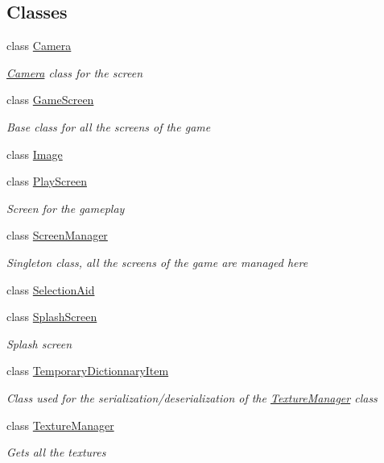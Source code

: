 \subsection*{Classes}
\begin{DoxyCompactItemize}
\item 
class \hyperlink{class_hel_project_1_1_u_i_1_1_camera}{Camera}
\begin{DoxyCompactList}\small\item\em \hyperlink{class_hel_project_1_1_u_i_1_1_camera}{Camera} class for the screen \end{DoxyCompactList}\item 
class \hyperlink{class_hel_project_1_1_u_i_1_1_game_screen}{Game\+Screen}
\begin{DoxyCompactList}\small\item\em Base class for all the screens of the game \end{DoxyCompactList}\item 
class \hyperlink{class_hel_project_1_1_u_i_1_1_image}{Image}
\item 
class \hyperlink{class_hel_project_1_1_u_i_1_1_play_screen}{Play\+Screen}
\begin{DoxyCompactList}\small\item\em Screen for the gameplay \end{DoxyCompactList}\item 
class \hyperlink{class_hel_project_1_1_u_i_1_1_screen_manager}{Screen\+Manager}
\begin{DoxyCompactList}\small\item\em Singleton class, all the screens of the game are managed here \end{DoxyCompactList}\item 
class \hyperlink{class_hel_project_1_1_u_i_1_1_selection_aid}{Selection\+Aid}
\item 
class \hyperlink{class_hel_project_1_1_u_i_1_1_splash_screen}{Splash\+Screen}
\begin{DoxyCompactList}\small\item\em Splash screen \end{DoxyCompactList}\item 
class \hyperlink{class_hel_project_1_1_u_i_1_1_temporary_dictionnary_item}{Temporary\+Dictionnary\+Item}
\begin{DoxyCompactList}\small\item\em Class used for the serialization/deserialization of the \hyperlink{class_hel_project_1_1_u_i_1_1_texture_manager}{Texture\+Manager} class \end{DoxyCompactList}\item 
class \hyperlink{class_hel_project_1_1_u_i_1_1_texture_manager}{Texture\+Manager}
\begin{DoxyCompactList}\small\item\em Gets all the textures \end{DoxyCompactList}\end{DoxyCompactItemize}
